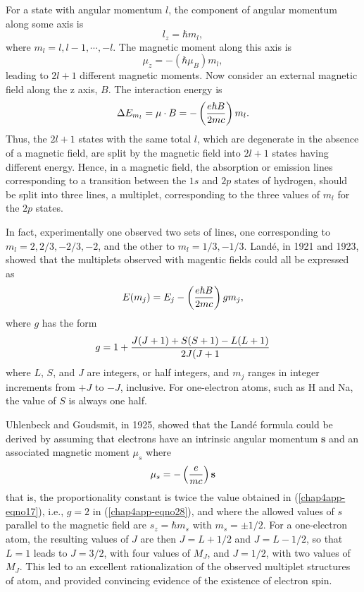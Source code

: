 For a state with angular momentum $l$, the component of angular momentum 
along some axis is
\begin{equation}
l_z = \hbar m_l ,
\end{equation}
where $m_l = l , l - 1 , \cdots , -l$.  The magnetic moment along this 
axis is
\begin{equation}
\mu_z = - \left( \hbar \mu_B \right) m_l ,
\end{equation}
leading to $2l + 1$ different magnetic moments.  Now consider an 
external magnetic field along the z axis, $B$. The interaction energy is
\begin{equation}
\Delta E_{m_l} = \mu \cdot B = - \left( {e \hbar B \over 2mc} \right) 
m_l .
\end{equation}
Thus, the $2l + 1$ states with the same total $l$, which are degenerate 
in the absence of a magnetic field, are split by the magnetic field 
into $2l + 1$ states having different energy.  Hence, in a magnetic 
field, the absorption or emission lines corresponding to a transition 
between the $1s$ and $2p$ states of hydrogen, should be
split into three lines, a multiplet, corresponding to the three 
values of $m_l$ for the $2p$ states.

In fact, experimentally one observed two sets of lines, one 
corresponding to $m_l = 2, 2/3, -2/3 , -2$, and the other to $m_l = 1/3, 
-1/3$.  Land\'e, in 1921 and 1923, showed that
the multiplets observed with magentic fields could all be expressed as
\begin{equation}
E ( m_j ) = E_j - \left( {e \hbar B \over 2mc} \right) gm_j ,
\end{equation}
where $g$ has the form
\begin{equation}
g = 1 + {J(J+1) + S(S+1) - L(L+1) \over 2J(J+1}
\label{chap4app-eqno28}
\end{equation}   
where $L$, $S$, and $J$ are integers, or half integers, and $m_j$ 
ranges in integer increments from $+J$ to $-J$, inclusive.  For one-electron 
atoms, such as H and Na, the value of $S$ is always one half.

Uhlenbeck and Goudsmit, in 1925, showed that the Land\'e formula could be
derived by assuming that electrons have an intrinsic angular momentum 
{\bf s} and an associated magnetic moment $\mu_s$ where
\begin{equation}
\mu_s = - \left( {e \over mc} \right) {\bf s}
\label{chap4app-eqno29}
\end{equation}
that is, the proportionality constant is twice the value obtained in
(\ref{chap4app-eqno17}), i.e., $g = 2$ in (\ref{chap4app-eqno28}), and
where the allowed values of $s$ parallel to the magnetic field are
$s_z = \hbar m_s$ with $m_s = \pm 1/2$.  For a one-electron atom, the
resulting values of $J$ are then $J = L + 1/2$ and $J = L - 1/2$, so
that $L = 1$ leads to $J = 3/2$, with four values of $M_J$, and $J =
1/2$, with two values of $M_J$.  This led to an excellent
rationalization of the observed multiplet structures of atom, and
provided convincing evidence of the existence of electron spin.

